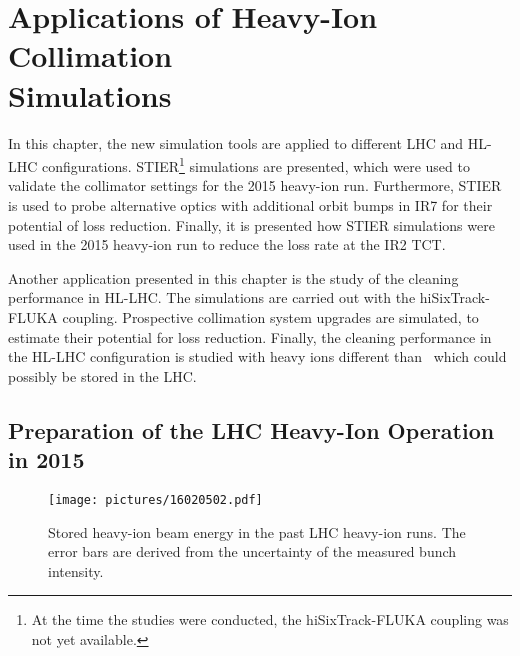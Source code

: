 \chapter[Applications of Heavy-Ion Collimation Simulations]{Applications of Heavy-Ion Collimation \\ Simulations} \label{chap:sim_meas}


In this chapter, the new simulation tools are applied to different LHC and HL-LHC configurations. STIER\footnote{At the time the studies were conducted, the hiSixTrack-FLUKA coupling was not yet available.} simulations are presented, which were used to validate the collimator settings for the 2015 heavy-ion run. Furthermore, STIER is used to probe alternative optics with additional orbit bumps in IR7 for their potential of loss reduction. Finally, it is presented how STIER simulations were used in the 2015 heavy-ion run to reduce the loss rate at the IR2 TCT.

Another application presented in this chapter is the study of the cleaning performance in \mbox{HL-LHC}. The simulations are carried out with the hiSixTrack-FLUKA coupling. Prospective collimation system upgrades are simulated, to estimate their potential for loss reduction. Finally, the cleaning performance in the HL-LHC configuration is studied with heavy ions different \mbox{than \lead} which could possibly be stored in the LHC.



\section{Preparation of the LHC Heavy-Ion Operation in 2015} \label{chap:prep2015}

\begin{figure}[t]  
    \centering
    \texttt{[image: pictures/16020502.pdf]}
    \caption{Stored heavy-ion beam energy in the past LHC heavy-ion runs. The error bars are derived from the uncertainty of the measured bunch intensity.}  
    \label{pic:16020502}
\end{figure}

